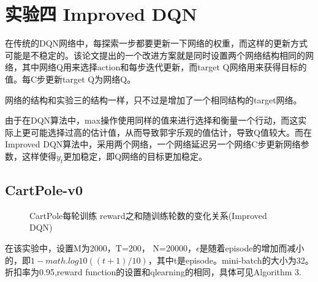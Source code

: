 \documentclass[a4paper,UTF8]{article}
\theoremstyle{definition}
\begin{document}
\section*{实验四 Improved DQN}
	在传统的DQN网络中，每探索一步都要更新一下网络的权重，而这样的更新方式可能是不稳定的\cite{mnih2015human}。该论文\cite{mnih2015human}提出的一个改进方案就是同时设置两个网络结构相同的网络，其中网络Q用来选择action和每步迭代更新，而target Q网络用来获得目标的值。每C步更新target Q为网络Q。

网络的结构和实验三的结构一样，只不过是增加了一个相同结构的target网络。

由于在DQN算法中，max操作使用同样的值来进行选择和衡量一个行动，而这实际上更可能选择过高的估计值，从而导致郭宇乐观的值估计，导致Q值较大。而在Improved DQN算法中，采用两个网络，一个网络延迟另一个网络C步更新网络参数，这样使得$y_t$更加稳定，即Q网络的目标更加稳定。

\subsection*{CartPole-v0}

\begin{figure}[htb]
    \caption{\label{CartPole:3} CartPole每轮训练 reward之和随训练轮数的变化关系(Improved DQN)}
    \end{figure}
在该实验中，设置M为2000，T=200， N=20000，$\epsilon$是随着episode的增加而减小的，即$1-math.log10((t+1)/10)$，其中t是episode。mini-batch的大小为32。折扣率为0.95,reward function的设置和qlearning的相同，具体可见Algorithm 3.
\end{document}
